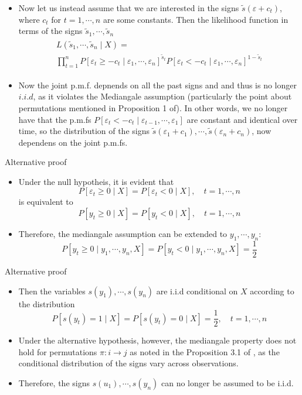 \documentclass{beamer}
\begin{document}
\begin{frame}
\begin{itemize}
\item{} Now let us instead assume that we are interested in the signs $\tilde{s}(\varepsilon+c_t)$, where $c_t$ for $t=1,\cdots,n$ are some constants. Then the likelihood function in terms of the signs $\tilde{s}_1,\cdots,\tilde{s}_n$ 
\begin{align*}
\begin{array}{l}
L(\tilde{s}_1,\cdots,\tilde{s}_n\mid X)=\\
\prod\limits_{t=1}^{n}P[\varepsilon_t\geq -c_t\mid \varepsilon_1,\cdots,\varepsilon_n]^{\tilde{s}_t}P[\varepsilon_t< -c_t \mid \varepsilon_1,\cdots,\varepsilon_n]^{1-\tilde{s}_t}	
\end{array}
\end{align*}
\item{} Now the joint p.m.f. depnends on all the past signs and and thus is no longer $i.i.d$, as it violates the Mediangale assumption (particularly the point about permutations mentioned in Proposition 1 of). In other words, we no longer have that the p.m.fs $P[\varepsilon_t<-c_t\mid \varepsilon_{t-1},\cdots,\varepsilon_{1}]$ are constant and identical over time, so the distribution of the signs $\tilde{s}(\varepsilon_1+c_1),\cdots,\tilde{s}(\varepsilon_n+c_n)$, now dependens on the joint p.m.fs.
\end{itemize}
\end{frame}

\begin{frame}{Alternative proof}
\begin{itemize}
\item{}Under the null hypotheis, it is evident that
\[
P[\varepsilon_t\geq0\mid X]=P[\varepsilon_t<0\mid X],\quad t=1,\cdots,n
\]
is equivalent to
\[
P[y_t\geq0\mid X]=P[y_t<0\mid X],\quad t=1,\cdots,n
\]
\item{}Therefore, the mediangale assumption can be extended to $y_1,\cdots,y_n$:
\[
P[y_t\geq0\mid y_1,\cdots,y_n,X]=P[y_t<0\mid y_1,\cdots,y_n,X]=\frac{1}{2}
\]
\end{itemize}
\end{frame}

\begin{frame}{Alternative proof}
\begin{itemize}
\item{}Then the variables $s(y_1),\cdots,s(y_n)$ are i.i.d conditional on $X$ according to the distribution
\[
P[s(y_t)=1\mid X]=P[s(y_t)=0\mid X]=\frac{1}{2},\quad t=1,\cdots,n
\]
\item{} Under the alternative hypothesis, however, the mediangale property does not hold for permutations $\pi:i\rightarrow j$ as noted in the Proposition 3.1 of , as the conditional distribution of the signs vary across observations.

\item{} Therefore, the signs $s(u_1),\cdots,s(y_n)$ can no longer be assumed to be i.i.d.
\end{itemize}
\end{frame}

%
%
\end{document}
